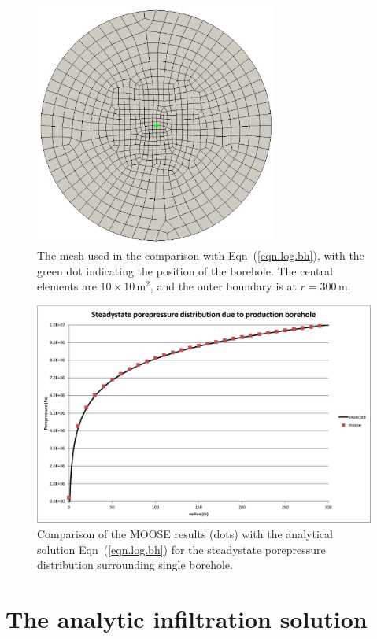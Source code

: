 \documentclass[]{scrreprt}
\begin{document}
\begin{figure}[htb]
\centering
\includegraphics[width=8cm]{bh07.mesh.eps}
\caption{The mesh used in the comparison with Eqn~(\ref{eqn.log.bh}),
  with the green dot indicating the position of the borehole.
  The central elements are $10\times 10$\,m$^{2}$, and the outer
  boundary is at $r=300$\,m.}
\label{bh07.mesh.fig}
\end{figure}



\begin{figure}[htb]
\centering
\includegraphics[width=12cm]{bh07.eps}
\caption{Comparison of the MOOSE results (dots) with the analytical
  solution Eqn~(\ref{eqn.log.bh}) for the steadystate porepressure
  distribution surrounding single borehole.}
\label{bh07.fig}
\end{figure}





\chapter{The analytic infiltration solution}
\label{bw}
\end{document}
